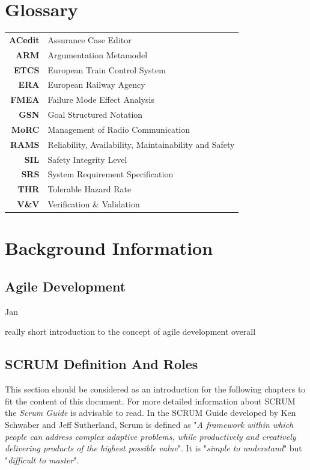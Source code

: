 
\section{Glossary}
\label{sec:glossary}



\begin{tabular}{rl}
\textbf{ACedit} & Assurance Case Editor \\ 
\textbf{ARM} & Argumentation  Metamodel \\ 
\textbf{ETCS} & European Train Control System \\ \textbf{ERA} & European Railway Agency \\ \textbf{FMEA} & Failure Mode Effect Analysis \\ 
\textbf{GSN} & Goal Structured Notation \\ 
\textbf{MoRC} & Management of Radio Communication \\ 
\textbf{RAMS} & Reliability, Availability, Maintainability and Safety \\
\textbf{SIL} & Safety Integrity Level \\ 
\textbf{SRS} & System Requirement Specification \\ 
\textbf{THR} & Tolerable Hazard Rate \\ 
\textbf{V\&V} & Verification \& Validation \\ 
\end{tabular} 




\section{Background Information}
\label{sec:Background}


\subsection{Agile Development}

Jan

really short introduction to the concept of agile development overall

\subsection{SCRUM Definition And Roles}

This section should be considered as an introduction for the following chapters to fit the content of this document. For more detailed information about SCRUM the \textit{Scrum Guide} is advisable to read. In the SCRUM Guide developed by Ken Schwaber and Jeff Sutherland, Scrum is defined as "\textit{A framework within which people can address complex adaptive problems, while productively and creatively delivering products of the highest possible value}". It is "\textit{simple to understand}" but "\textit{difficult to master}".

